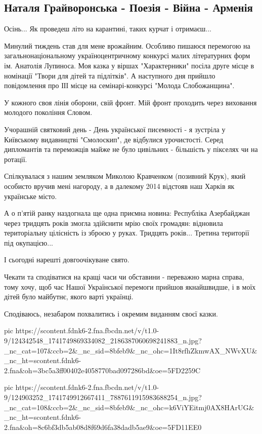  
 
 

\subsection{Наталя Грайворонська - Поезія - Війна - Арменія}

Осінь... Як проведеш літо на карантині,  таких курчат і отримаєш...

Минулий тиждень став для мене врожайним. Особливо пишаюся перемогою на
загальнонаціональному україноцентричному  конкурсі малих  літературних форм ім.
Анатолія Лупиноса. Моя казка у віршах "Характерники" посіла друге місце в
номінації "Твори для дітей та підлітків". А наступного дня прийшло повідомлення
про ІІІ місце на семінарі-конкурсі "Молода Слобожанщина".

У кожного своя лінія оборони, свій фронт.  Мій фронт проходить через виховання
молодого покоління Словом. 

Учорашній святковий день - День української писемності - я зустріла у
Київському видавництві "Смолоскип", де відбулися урочистості. Серед дипломантів
та переможців майже не було цивільних - більшість у пікселях чи на ротації.

Спілкувалася з нашим земляком Миколою Кравченком (позивний Крук), який особисто
вручив мені нагороду, а в далекому 2014 відстояв наш Харків як українське
місто. 

А о п'ятій ранку наздогнала ще одна приємна новина: Республіка Азербайджан
через тридцять років змогла здійснити мрію своїх громадян: відновила
територіальну цілісність із зброєю у руках. Тридцять років... Третина території
під окупацією... 

І сьогодні нарешті довгоочікуване свято. 

Чекати та сподіватися на кращі часи чи обставини - переважно марна справа,
тому хочу,  щоб час Нашої Української перемоги прийшов якнайшвидше, і в моїх
дітей було майбутнє, якого варті українці. 

Сподіваюсь, незабаром похвалитись і окремим виданням своєї казки.

\ifcmt
pic https://scontent.fdnk6-2.fna.fbcdn.net/v/t1.0-9/124342548_1741749869334082_2186387060698241883_n.jpg?_nc_cat=107&ccb=2&_nc_sid=8bfeb9&_nc_ohc=1It8rfhZkmwAX_NWvXU&_nc_ht=scontent.fdnk6-2.fna&oh=3bc5a3ff00402e4058770bad097286bd&oe=5FD2259C

pic https://scontent.fdnk6-2.fna.fbcdn.net/v/t1.0-9/124903252_1741749912667411_7887611915983688254_n.jpg?_nc_cat=108&ccb=2&_nc_sid=8bfeb9&_nc_ohc=k6ViYEitmj0AX8HArUG&_nc_ht=scontent.fdnk6-2.fna&oh=8c6bf3db5ab08d8f69d6fa38dadb5ae9&oe=5FD11EE0

\fi
